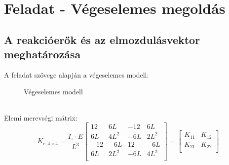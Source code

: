 \documentclass{article}
\begin{document}
	\section{Feladat - Végeselemes megoldás}
	\subsection{A reakcióerők és az elmozdulásvektor meghatározása}
		A feladat szövege alapján a végeselemes modell:
		\newcommand{\sugar}{2}
		\newcommand{\ab}{230}
		\newcommand{\ac}{460}
		\newcommand{\ad}{610}
		\newcommand{\adv}{610}
		\newcommand{\advv}{610}
		\begin{figure}[h!]		
			\begin{center}	
			\end{center}	
			\caption{Végeselemes modell}
		\end{figure}\\[10pt]	
		Elemi merevségi mátrix:
		\begin{equation}
		K_{e,4\times4}= \frac{I_{z} \cdot E}{L^3}  
			\begin{bmatrix}
			12&6L&-12&6L\\
			6L&4L^2&-6L&2L^2\\
			-12&-6L&12&-6L\\
			6L&2L^2&-6L&4L^2\\
			\end{bmatrix}
			=\begin{bmatrix}
			K_{11} &K_{12} \\
			K_{21} &K_{22} \\
			\end{bmatrix}
		\end{equation}\\[10pt]
\end{document}
